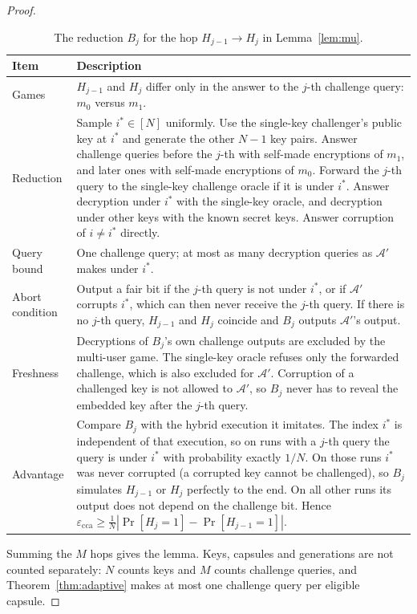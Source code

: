 \documentclass[pdflatex,sn-mathphys-num]{sn-jnl}%
\theoremstyle{plain}
\theoremstyle{definition}
\begin{document}
\begin{proof}
\begin{table}[htbp]
\caption{The reduction $B_j$ for the hop $H_{j-1}\to H_j$ in Lemma~\ref{lem:mu}.}\label{tab:mu}
\centering\footnotesize
\begin{tabularx}{\linewidth}{@{}p{.24\linewidth}Y@{}}\toprule
Item & Description\\\midrule
Games & $H_{j-1}$ and $H_j$ differ only in the answer to the $j$-th challenge query: $m_0$ versus $m_1$.\\
Reduction & Sample $i^*\in[N]$ uniformly. Use the single-key challenger's public key at $i^*$ and generate the other $N-1$ key pairs. Answer challenge queries before the $j$-th with self-made encryptions of $m_1$, and later ones with self-made encryptions of $m_0$. Forward the $j$-th query to the single-key challenge oracle if it is under $i^*$. Answer decryption under $i^*$ with the single-key oracle, and decryption under other keys with the known secret keys. Answer corruption of $i\ne i^*$ directly.\\
Query bound & One challenge query; at most as many decryption queries as $\mathcal A'$ makes under $i^*$.\\
Abort condition & Output a fair bit if the $j$-th query is not under $i^*$, or if $\mathcal A'$ corrupts $i^*$, which can then never receive the $j$-th query. If there is no $j$-th query, $H_{j-1}$ and $H_j$ coincide and $B_j$ outputs $\mathcal A'$'s output.\\
Freshness & Decryptions of $B_j$'s own challenge outputs are excluded by the multi-user game. The single-key oracle refuses only the forwarded challenge, which is also excluded for $\mathcal A'$. Corruption of a challenged key is not allowed to $\mathcal A'$, so $B_j$ never has to reveal the embedded key after the $j$-th query.\\
Advantage & Compare $B_j$ with the hybrid execution it imitates. The index $i^*$ is independent of that execution, so on runs with a $j$-th query the query is under $i^*$ with probability exactly $1/N$. On those runs $i^*$ was never corrupted (a corrupted key cannot be challenged), so $B_j$ simulates $H_{j-1}$ or $H_j$ perfectly to the end. On all other runs its output does not depend on the challenge bit. Hence $\varepsilon_{\mathrm{cca}}\ge\frac1N|\Pr[H_j=1]-\Pr[H_{j-1}=1]|$.\\\bottomrule
\end{tabularx}
\end{table}

Summing the $M$ hops gives the lemma. Keys, capsules and generations are not counted separately: $N$ counts keys and $M$ counts challenge queries, and Theorem~\ref{thm:adaptive} makes at most one challenge query per eligible capsule.
\end{proof}
\end{document}
